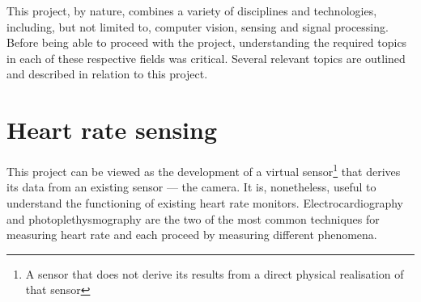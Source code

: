 This project, by nature, combines a variety of disciplines and technologies, including, but not limited to, computer vision, sensing and signal processing. 
Before being able to proceed with the project, understanding the required topics in each of these respective fields was critical. Several relevant topics are outlined 
and described in relation to this project.

\section{Heart rate sensing}
\label{prep:hr_sensing}
This project can be viewed as the development of a virtual sensor\footnote{A sensor that does not derive its results from a direct physical realisation of that sensor} that derives its data from an existing sensor --- the camera. 
It is, nonetheless, useful to understand the functioning of existing heart rate monitors.
Electrocardiography and photoplethysmography are the two of the most common techniques for measuring heart rate and each proceed by measuring different phenomena.

